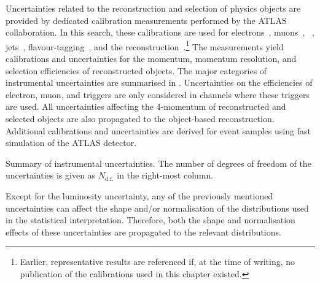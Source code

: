 Uncertainties related to the reconstruction and selection of physics objects are
provided by dedicated calibration measurements performed by the ATLAS
collaboration. In this search, these calibrations are used for
electrons~\cite{EGAM-2018-01,TRIG-2018-05}, muons~\cite{MUON-2018-03},
\tauhadvis~\cite{ATLAS-CONF-2017-029}, jets~\cite{JETM-2018-05},
flavour-tagging~\cite{FTAG-2018-01,FTAG-2020-08,FTAG-2021-002}, and the
\pTmissAbs reconstruction~\cite{ATLAS-CONF-2018-023}.\footnote{Earlier,
  representative results are referenced if, at the time of writing, no
  publication of the calibrations used in this chapter existed.} The
measurements yield calibrations and uncertainties for the momentum, momentum
resolution, and selection efficiencies of reconstructed objects. The major
categories of instrumental uncertainties are summarised in
. Uncertainties on the efficiencies of
electron, muon, and \tauhadvis triggers are only considered in channels where
these triggers are used. All uncertainties affecting the 4-momentum of
reconstructed and selected objects are also propagated to the object-based
\pTmissAbs reconstruction. Additional calibrations and uncertainties are derived
for event samples using fast simulation of the ATLAS detector.


\begin{table}[htbp]
  \centering

  \caption{Summary of instrumental uncertainties. The number of degrees of
    freedom of the uncertainties is given as $N_{\text{d.f.}}$ in the right-most
    column.}%
  \label{tab:experimental_uncertainties_2}

  \renewcommand{\arraystretch}{1.25}
  
\end{table}

Except for the luminosity uncertainty, any of the previously mentioned
uncertainties can affect the shape and/or normalisation of the distributions
used in the statistical interpretation. Therefore, both the shape and
normalisation effects of these uncertainties are propagated to the relevant
distributions.

